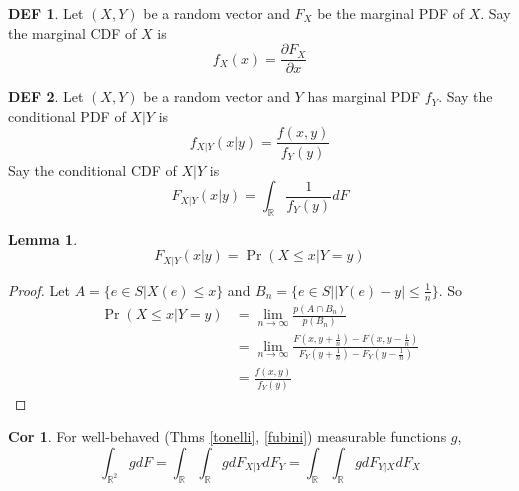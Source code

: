\documentclass{article}
\theoremstyle{definition}\newtheorem{definition}{DEF}
\theoremstyle{lemma}\newtheorem{lemma}{Lemma}
\theoremstyle{corrolary}\newtheorem{corrolary}{Cor}
\begin{document}
\begin{definition}
Let $(X,Y)$ be a random vector and $F_X$ be the marginal PDF of $X$.
Say the marginal CDF of $X$ is
\begin{equation}
f_X(x) = \frac{\partial F_X}{\partial x}
\end{equation}
\end{definition}

\begin{definition}
Let $(X,Y)$ be a random vector and $Y$ has marginal PDF $f_Y$.
Say the conditional PDF of $X|Y$ is
\begin{equation}
f_{X|Y}(x|y) = \frac{f(x,y)}{f_Y(y)}
\end{equation}
Say the conditional CDF of $X|Y$ is
\begin{equation}
F_{X|Y}(x|y)=\int_\mathbb{R} \frac{1}{f_Y(y)} dF
\end{equation}
\end{definition}

\begin{lemma}
\begin{equation}
F_{X|Y}(x|y)=\Pr(X\leq x | Y=y)
\end{equation}
\end{lemma}
\begin{proof}
Let $A=\{e\in S|X(e)\leq x\}$ and $B_n=\{e\in S||Y(e)-y|\leq \frac{1}{n}\}$.
So
\begin{align*}
\Pr(X\leq x | Y=y) &= \lim_{n\rightarrow \infty} \frac{p(A \cap B_n)}{p(B_n)}\\
&=\lim_{n \rightarrow \infty} \frac{F(x, y+\frac{1}{n}) - F(x, y-\frac{1}{n})}{F_Y(y+\frac{1}{n})-F_Y(y-\frac{1}{n})}\\
&=\frac{f(x,y)}{f_Y(y)}
\end{align*}
\end{proof}
\begin{corrolary}
For well-behaved (Thms \ref{tonelli}, \ref{fubini}) measurable functions $g$, $$\int_{\mathbb{R}^2} gdF=\int_\mathbb{R} \int_\mathbb{R} g dF_{X|Y}dF_Y =\int_\mathbb{R} \int_\mathbb{R} g dF_{Y|X}dF_X$$
\end{corrolary}
\end{document}
